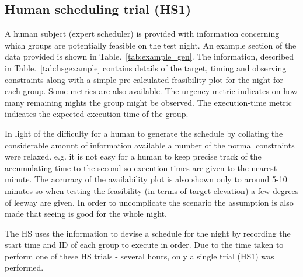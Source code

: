 \subsection{Human scheduling trial (HS1)}
A human subject (expert scheduler) is provided with information concerning which groups are potentially feasible on the test night. An example section of the data provided is shown in Table.~\ref{tab:example_gen}. The information, described in Table.~\ref{tab:hsgexample} contains details of the target, timing and observing constraints along with a simple pre-calculated feasibility plot for the night for each group. Some metrics are also available. The urgency metric indicates on how many remaining nights the group might be observed. The execution-time metric indicates the expected execution time of the group. 

In light of the difficulty for a human to generate the schedule by collating the considerable amount of information available a number of the normal constraints were relaxed. e.g. it is not easy for a human to keep precise track of the accumulating time to the second so execution times are given to the nearest minute. The accuracy of the availability plot is also shown only to around 5-10 minutes so when testing the feasibility (in terms of target elevation) a few degrees of leeway are given. In order to uncomplicate the scenario the assumption is also made that seeing is good for the whole night. 

The HS uses the information to devise a schedule for the night by recording the start time and ID of each group to execute in order. Due to the time taken to perform one of these HS trials - several hours, only a single trial (HS1) was performed.


